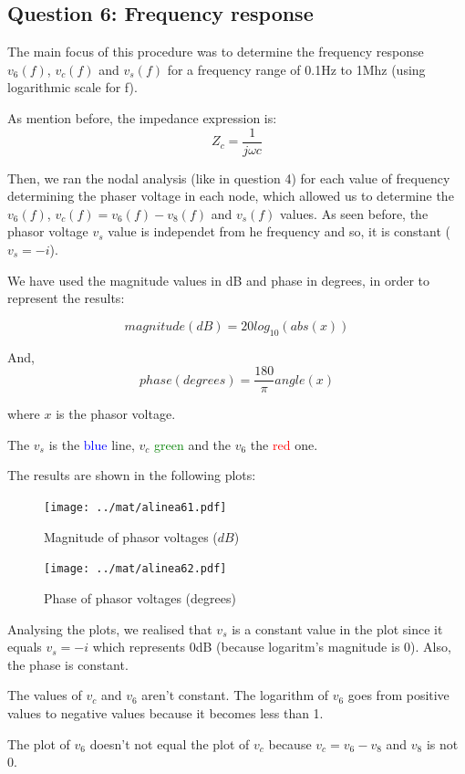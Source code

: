 \subsection{Question 6: Frequency response}
The main focus of this procedure was to determine the frequency response $v_6(f)$, $v_c(f)$ and $v_s(f)$ for a frequency range of 0.1Hz to 1Mhz (using logarithmic scale for f). \par
As mention before, the impedance expression is:
\begin{equation}
     Z_c = \frac{1}{j\omega c}
\end{equation}\par
Then, we ran the nodal analysis (like in question 4) for each value of frequency determining the phaser voltage in each node, which allowed us to determine the $v_6(f)$, $v_c(f) = v_6(f) - v_8(f)$ and $v_s(f)$ values. As seen before, the phasor voltage $v_s$ value is independet from he frequency and so, it is constant ($v_s = -i$). \par
We have used the magnitude values in dB and phase in degrees, in order to represent the results:\par
\begin{equation}
     magnitude (dB) = 20log_{10}(abs(x))
\end{equation}\par
And,
\begin{equation}
     phase (degrees) = \frac{180}{\pi}angle(x)
\end{equation}\par
where $x$ is the phasor voltage.\par
The $v_s$ is the \textcolor{blue}{blue} line, $v_c$ \textcolor{green}{green} and the $v_6$ the \textcolor{red}{red} one.\par
The results are shown in the following plots: \par

\begin{figure}[H] \centering
\texttt{[image: ../mat/alinea61.pdf]}
\caption{Magnitude of phasor voltages ($dB$)}
\label{fig:plot6}
\end{figure}

\begin{figure}[H] \centering
\texttt{[image: ../mat/alinea62.pdf]}
\caption{Phase of phasor voltages (degrees)}
\label{fig:plot7}
\end{figure}

Analysing the plots, we realised that $v_s$ is a constant value in the plot since it equals $v_s= -i$ which represents 0dB (because logaritm's magnitude is 0). Also, the phase is constant. \par
The values of $v_c$ and $v_6$ aren't constant. The logarithm of $v_6$ goes from positive values to negative values because it becomes less than 1. \par
The plot of $v_6$ doesn't not equal the plot of $v_c$ because $v_c=v_6 - v_8$ and $v_8$ is not 0.





